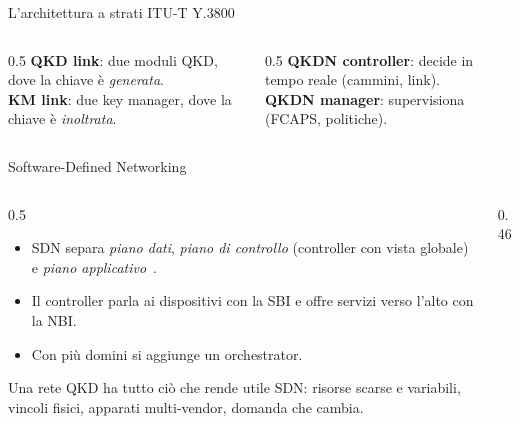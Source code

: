 \documentclass[10pt]{beamer}
\begin{document}
\begin{frame}{L'architettura a strati ITU-T Y.3800}
  \small
  \begin{columns}[T]
    \begin{column}{0.5\textwidth}
      \textbf{QKD link}: due moduli QKD, dove la chiave è \emph{generata}.\\
      \textbf{KM link}: due key manager, dove la chiave è \emph{inoltrata}.
    \end{column}
    \begin{column}{0.5\textwidth}
      \textbf{QKDN controller}: decide in tempo reale (cammini, link).\\
      \textbf{QKDN manager}: supervisiona (FCAPS, politiche).
    \end{column}
  \end{columns}
\end{frame}

\begin{frame}{Software-Defined Networking}
  \begin{columns}[c]
    \begin{column}{0.5\textwidth}
      \begin{itemize}
        \item SDN separa \emph{piano dati}, \emph{piano di controllo}
              (controller con vista globale) e \emph{piano applicativo}~\cite{kreutz2015}.
        \item Il controller parla ai dispositivi con la \alert{SBI} e offre
              servizi verso l'alto con la \alert{NBI}.
        \item Con più domini si aggiunge un \alert{orchestrator}.
      \end{itemize}
      \vspace{1ex}
      \small Una rete QKD ha tutto ciò che rende utile SDN: risorse scarse
      e variabili, vincoli fisici, apparati multi-vendor, domanda che cambia.
    \end{column}
    \begin{column}{0.46\textwidth}
      \begin{center}
      \end{center}
    \end{column}
  \end{columns}
\end{frame}
\end{document}
